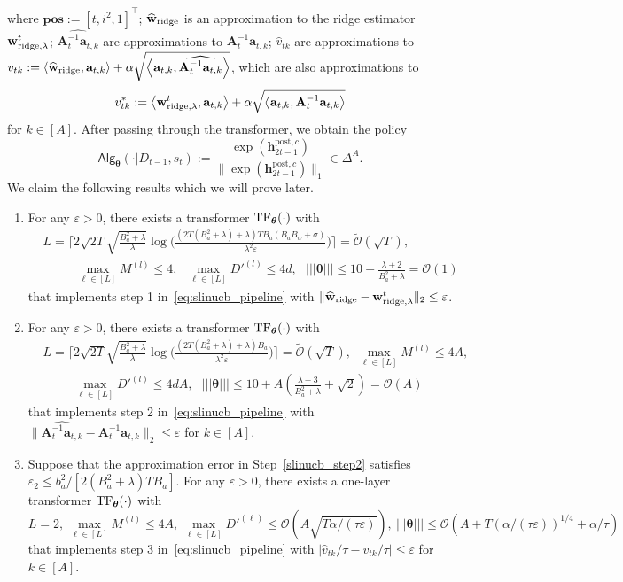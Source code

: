 \documentclass[10pt]{article}
\renewcommand{\hat}{\widehat}
\newcommand{\eps}{\varepsilon}
\renewcommand{\cO}{\mathcal{O}}
\newcommand{\<}{\left\langle}
\renewcommand{\>}{\right\rangle}
\newcommand{\lth}{{(\ell)}}
\newcommand{\TF}{{\rm TF}}
\newcommand{\ridge}{{\rm ridge}}
\newcommand{\nrmp}[1]{{\left|\!\left|\!\left|{#1}\right|\!\right|\!\right|}}
\newcommand{\posv}{{\mathbf{pos}}}
\newcommand{\post}{{\mathrm{post}}}
\newcommand{\partc}{{c}}
\newcommand{\temp}{{\tau}}
\newcommand{\tcO}{{\tilde{\mathcal O}}}
\newcommand{\state}{{s}}
\newcommand{\sAlg}{{\mathsf{Alg}}}
\newcommand{\dset}{{D}}
\newcommand{\tfpar}{{\btheta}}
\newcommand{\hidden}{{D'}}
\def\bA{{\mathbf A}}
\def\btheta{{\boldsymbol \theta}}
\def\ba{{\mathbf a}}
\def\bh{{\mathbf h}}
\def\bw{{\mathbf w}}
\begin{document}
where $\posv:=[t,i^2,1]^\top$; $\hat\bw_{\ridge}$ is an approximation to the ridge estimator $\bw^t_{\ridge,\lambda}$; $\widehat{\bA_{t}^{-1}\ba_{t,k}}$ are approximations to ${\bA_{t}^{-1}\ba_{t,k}}$;  $\hat v_{tk}$ are approximations to $v_{tk}:=\<\hat\bw_{\ridge},\ba_{t,k}\>+\alpha\sqrt{\<\ba_{t,k}, \widehat{\bA_t^{-1} \ba_{t,k}}\>}$, which are also approximations to $$
v^*_{tk}:=\<\bw^t_{\ridge,\lambda},\ba_{t,k}\>+\alpha\sqrt{\<\ba_{t,k}, {\bA_t^{-1} \ba_{t,k}}\>}
$$ for $k\in[A]$. After passing through the transformer, we obtain the policy  
$$
\sAlg_{\tfpar}(\cdot|\dset_{t-1},\state_t):=\frac{\exp(\bh^{\post,\partc}_{2t-1})}{\|\exp(\bh^{\post,\partc}_{2t-1})\|_1}\in\Delta^A.$$ 
We claim the following results which we will prove later.
\begin{enumerate}[label=Step \arabic*,ref= \arabic*]
    \item \label{slinucb_step1} For any $\eps>0$, 
    there exists a transformer $\TF_\btheta(\cdot)$ with 
\begin{align*}
&L=\Big\lceil2\sqrt{2T}\sqrt{\frac{B_a^2+\lambda}{\lambda}}\log\Big(\frac{(2T(B_a^2+\lambda)+\lambda)TB_a(B_aB_w+\sigma)}{\lambda^2\eps}\Big)\Big\rceil=\tcO(\sqrt{T}),\\
&~~~\qquad\max_{\ell\in[L]}M^{(l)}\leq4,~~~\max_{\ell\in[L]}\hidden^{(l)}\leq4d,~~~ \nrmp{\btheta}\leq  10+\frac{\lambda+2}{B_a^2+\lambda}=\cO(1) \end{align*}
 that implements step 1 in~\eqref{eq:slinucb_pipeline} with  $\|\hat\bw_{\ridge}-\bw^t_{\ridge,\lambda}\|_2\leq\eps$.
   \item\label{slinucb_step2}
   For any $\eps>0$, there exists a transformer $\TF_\btheta(\cdot)$ with 
\begin{align*}
&L=\Big\lceil2\sqrt{2T}\sqrt{\frac{B_a^2+\lambda}{\lambda}}\log\Big(\frac{(2T(B_a^2+\lambda)+\lambda)B_a}{\lambda^2\eps}\Big)\Big\rceil=\tcO(\sqrt{T}),~~\max_{\ell\in[L]}M^{(l)}\leq4A,\\
&\qquad~~
\max_{\ell\in[L]}\hidden^{(l)}\leq4dA,~~~ \nrmp{\btheta}\leq  10+A(\frac{\lambda+3}{B_a^2+\lambda}+\sqrt{2})=\cO(A) \end{align*}
 that implements step 2 in~\eqref{eq:slinucb_pipeline} with  $\|\widehat{\bA_{t}^{-1}\ba_{t,k}}-\bA_{t}^{-1}\ba_{t,k}\|_2\leq\eps$ for $k\in[A]$.
  \item\label{slinucb_step3} Suppose that the approximation error in Step~\ref{slinucb_step2} satisfies $\eps_2\leq b_a^2/[2(B_a^2+\lambda)TB_a]$.
  For any $\eps>0$, 
  there exists a one-layer transformer $\TF_\btheta(\cdot)$ with 
    $$
    L=2,~\max_{\ell\in[L]}M^{(l)}\leq 4A,~ \max_{\ell\in[L]}\hidden^\lth\leq \cO(A\sqrt{T\alpha/(\temp\eps)}),~\nrmp{\btheta}\leq  \cO(A+T({\alpha/(\temp\eps)})^{1/4}+\alpha/\temp) $$
 that implements step 3 in~\eqref{eq:slinucb_pipeline} with  $|\hat v_{tk}/\temp-v_{tk}/\temp|\leq\eps$ for $k\in[A]$.
\end{enumerate}
\end{document}
